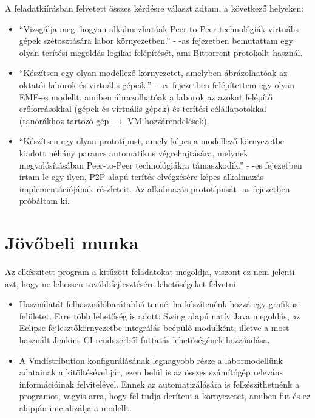 A feladatkiírásban felvetett összes kérdésre választ adtam, a következő helyeken:

\begin{itemize}
  \item ``Vizsgálja  meg,  hogyan  alkalmazhatóak  Peer-to-Peer  technológiák  virtuális  gépek 
szétosztására labor környezetben.'' - -as fejezetben bemutattam egy olyan terítési megoldás logikai felépítését, ami Bittorrent protokollt használ.
  \item ``Készítsen  egy  olyan  modellező  környezetet,  amelyben  ábrázolhatóak  az  oktatói 
laborok és virtuális gépeik.'' - -es fejezetben felépítettem egy olyan EMF-es modellt, amiben ábrazolhatóak a laborok az azokat felépítő erőforrásokkal (gépek és virtuális gépek) és terítési célállapotokkal (tanórákhoz tartozó gép $\rightarrow$ VM hozzárendelések).
  \item ``Készítsen egy olyan prototípust, amely képes a modellező környezetbe kiadott  néhány
parancs  automatikus  végrehajtására,  melynek  megvalósításában  Peer-to-Peer 
technológiákra támaszkodik.'' - -es fejezetben írtam le egy ilyen, P2P alapú terítés elvégzésére képes alkalmazás implementációjának részleteit. Az alkalmazás prototípusát -as fejezetben próbáltam ki.
\end{itemize}


\section{Jövőbeli munka}
Az elkészített program a kitűzött feladatokat megoldja, viszont ez nem jelenti azt, hogy ne lehessen továbbfejlesztésére lehetőségeket felvetni:
\begin{itemize}
  \item Használatát felhasználóbarátabbá tenné, ha készítenénk hozzá egy grafikus felületet. Erre több lehetőség is adott: Swing\cite{zukowski2005definitive} alapú natív Java megoldás, az Eclipse fejlesztőkörnyezetbe integrálás beépülő modulként, illetve a most használt Jenkins CI rendszerből futtatás lehetőségének hozzáadása.
  \item A Vmdistribution konfigurálásának legnagyobb része a labormodellünk adatainak a kitöltésével jár, ezen belül is az összes számítógép releváns információinak felvitelével. Ennek az automatizálására is felkészíthetnénk a programot, vagyis arra, hogy fel tudja deríteni a környezetet, amiben fut és ez alapján inicializálja a modellt.
\end{itemize}
